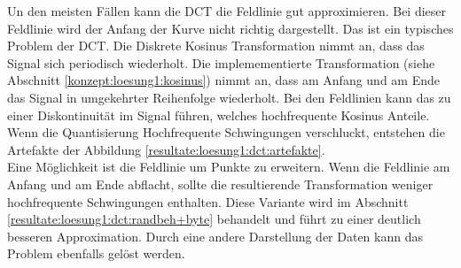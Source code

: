 Un den meisten Fällen kann die DCT die Feldlinie gut approximieren. Bei dieser Feldlinie wird der Anfang der Kurve nicht richtig dargestellt. Das ist ein typisches Problem der DCT. Die Diskrete Kosinus Transformation nimmt an, dass das Signal sich periodisch wiederholt. Die implemementierte Transformation (siehe Abschnitt \ref{konzept:loesung1:kosinus}) nimmt an, dass am Anfang und am Ende das Signal in umgekehrter Reihenfolge wiederholt. Bei den Feldlinien kann das zu einer Diskontinuität im Signal führen, welches hochfrequente Kosinus Anteile. Wenn die Quantisierung Hochfrequente Schwingungen verschluckt, entstehen die Artefakte der Abbildung \ref{resultate:loesung1:dct:artefakte}.\\
Eine Möglichkeit ist die Feldlinie um Punkte zu erweitern. Wenn die Feldlinie am Anfang und am Ende abflacht, sollte die resultierende Transformation weniger hochfrequente Schwingungen enthalten. Diese Variante wird im Abschnitt \ref{resultate:loesung1:dct:randbeh+byte} behandelt und führt zu einer deutlich besseren Approximation. Durch eine andere Darstellung der Daten kann das Problem ebenfalls gelöst werden.

